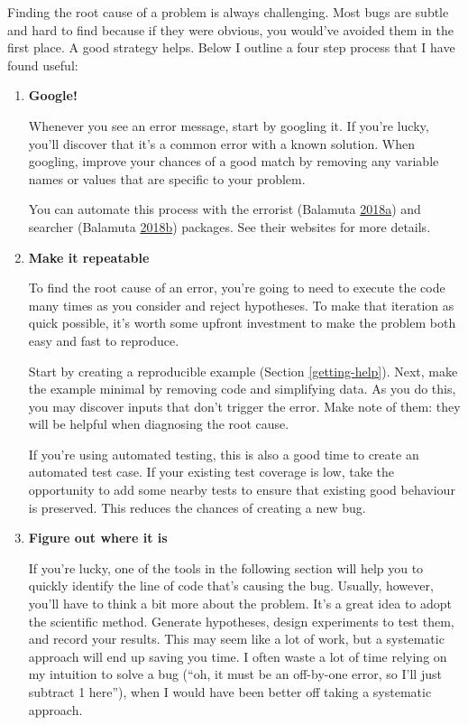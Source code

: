 \documentclass[]{book}
\begin{document}
Finding the root cause of a problem is always challenging. Most bugs are subtle and hard to find because if they were obvious, you would've avoided them in the first place. A good strategy helps. Below I outline a four step process that I have found useful:

\begin{enumerate}
\def\labelenumi{\arabic{enumi}.}
\item
  \textbf{Google!}

  Whenever you see an error message, start by googling it. If you're lucky,
  you'll discover that it's a common error with a known solution. When
  googling, improve your chances of a good match by removing any variable
  names or values that are specific to your problem.

  You can automate this process with the errorist (Balamuta \protect\hyperlink{ref-errorist}{2018}\protect\hyperlink{ref-errorist}{a}) and searcher
  (Balamuta \protect\hyperlink{ref-searcher}{2018}\protect\hyperlink{ref-searcher}{b}) packages. See their websites for more details.
\item
  \textbf{Make it repeatable}

  To find the root cause of an error, you're going to need to execute the
  code many times as you consider and reject hypotheses. To make that
  iteration as quick possible, it's worth some upfront investment to make
  the problem both easy and fast to reproduce.

  Start by creating a reproducible example (Section \ref{getting-help}).
  Next, make the example minimal by removing code and simplifying data.
  As you do this, you may discover inputs that don't trigger the error.
  Make note of them: they will be helpful when diagnosing the root cause.

  If you're using automated testing, this is also a good time to create an
  automated test case. If your existing test coverage is low, take the
  opportunity to add some nearby tests to ensure that existing good behaviour
  is preserved. This reduces the chances of creating a new bug.
\item
  \textbf{Figure out where it is}

  If you're lucky, one of the tools in the following section will help you to
  quickly identify the line of code that's causing the bug. Usually, however,
  you'll have to think a bit more about the problem. It's a great idea to
  adopt the scientific method. Generate hypotheses, design experiments to test
  them, and record your results. This may seem like a lot of work, but a
  systematic approach will end up saving you time. I often waste a lot of time
  relying on my intuition to solve a bug (``oh, it must be an off-by-one error,
  so I'll just subtract 1 here''), when I would have been better off taking a
  systematic approach.


\end{enumerate}
\end{document}
